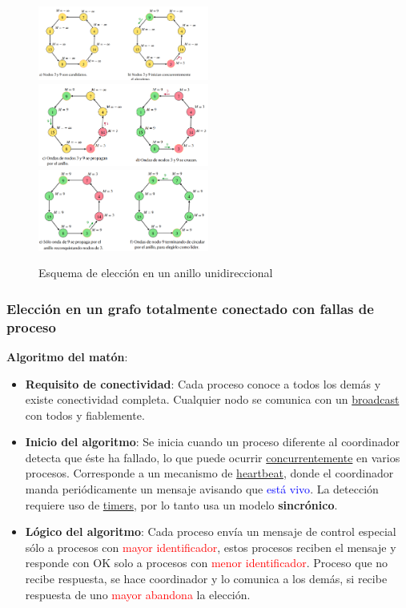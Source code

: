 \begin{figure}[H]
    \centering
    \includegraphics[width=0.5\textwidth]{img/AU_1.png}
    \includegraphics[width=0.5\textwidth]{img/AU_2.png}
    \includegraphics[width=0.5\textwidth]{img/AU_3.png}
    \caption{Esquema de elección en un anillo unidireccional}
\end{figure}

\subsubsection{Elección en un grafo totalmente conectado con fallas de proceso}

\textbf{Algoritmo del matón}:

\begin{itemize}
    \item \textbf{Requisito de conectividad}: Cada proceso conoce a todos los demás y existe conectividad completa. Cualquier nodo se comunica con un \underline{broadcast} con todos y fiablemente.

    \item \textbf{Inicio del algoritmo}: Se inicia cuando un proceso diferente al coordinador detecta que éste ha fallado, lo que puede ocurrir \underline{concurrentemente} en varios procesos. Corresponde a un mecanismo de \underline{heartbeat}, donde el coordinador manda periódicamente un mensaje avisando que \textcolor{blue}{está vivo}. La detección requiere uso de \underline{timers}, por lo tanto usa un modelo \textbf{sincrónico}.

    \item \textbf{Lógico del algoritmo}: Cada proceso envía un mensaje de control especial sólo a procesos con \textcolor{red}{mayor identificador}, estos procesos reciben el mensaje y responde con OK solo a procesos con \textcolor{red}{menor identificador}. Proceso que no recibe respuesta, se hace coordinador y lo comunica a los demás, si recibe respuesta de uno \textcolor{red}{mayor abandona} la elección.
\end{itemize}


